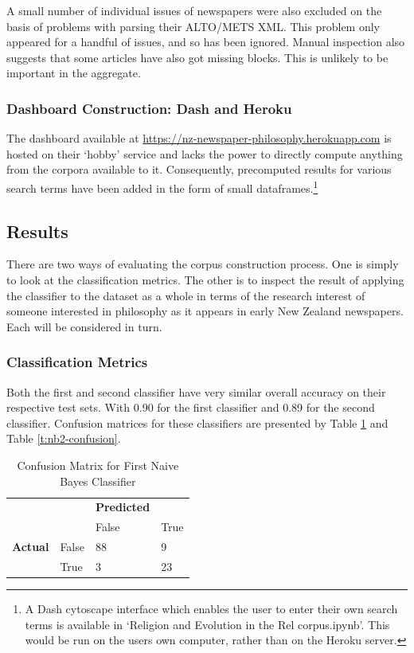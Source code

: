 \documentclass{article}
\begin{document}
A small number of individual issues of newspapers were also excluded on the basis of problems with parsing their ALTO/METS XML. This problem only appeared for a handful of issues, and so has been ignored. Manual inspection also suggests that some articles have also got missing blocks. This is unlikely to be important in the aggregate.

\subsubsection{Dashboard Construction: Dash and Heroku}

The dashboard available at \url{https://nz-newspaper-philosophy.herokuapp.com} is hosted on their `hobby' service and lacks the power to directly compute anything from the corpora available to it. Consequently, precomputed results for various search terms have been added in the form of small dataframes.\footnote{A Dash cytoscape interface which enables the user to enter their own search terms is available in `Religion and Evolution in the Rel corpus.ipynb'. This would be run on the users own computer, rather than on the Heroku server.}

\subsection{Results}\label{s:corpus-results}

There are two ways of evaluating the corpus construction process. One is simply to look at the classification metrics. The other is to inspect the result of applying the classifier to the dataset as a whole in terms of the research interest of someone interested in philosophy as it appears in early New Zealand newspapers. Each will be considered in turn.

\subsubsection{Classification Metrics}\label{s:classification-metrics}

Both the first and second classifier have very similar overall accuracy on their respective test sets. With 0.90 for the first classifier and 0.89 for the second classifier. Confusion matrices for these classifiers are presented by Table \ref{t:nb1-confusion} and Table \ref{t:nb2-confusion}.

\begin{table}[]
        \centering
        \footnotesize
        \begin{tabular}{ll|ll}
        & & \textbf{Predicted} & \\
        & & False & True \\
        \hline
        \textbf{Actual} & False & 88 & 9 \\
        & True & 3 & 23 \\
        \end{tabular}
        \caption{Confusion Matrix for First Naive Bayes Classifier}
        \label{t:nb1-confusion}
\end{table}
\end{document}
